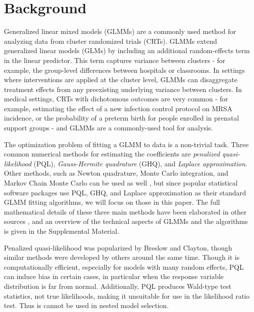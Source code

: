 \documentclass[Afour,times,sagev,doublespace]{sagej}
\begin{document}
\section{Background}
Generalized linear mixed models (GLMMs) are a commonly used method for analyzing data from cluster randomized trials (CRTs). GLMMs extend generalized linear models (GLMs) by including an additional random-effects term in the linear predictor. This term captures variance between clusters - for example, the group-level differences between hospitals or classrooms. In settings where interventions are applied at the cluster level, GLMMs can disaggregate treatment effects from any preexisting underlying variance between clusters. In medical settings, CRTs with dichotomous outcomes are very common - for example, estimating the effect of a new infection control protocol on MRSA incidence, or the probability of a preterm birth for people enrolled in prenatal support groups - and GLMMs are a commonly-used tool for analysis. 

The optimization problem of fitting a GLMM to data is a non-trivial task. Three common numerical methods for estimating the coefficients are \textit{penalized quasi-likelihood} (PQL), \textit{Gauss-Hermite quadrature} (GHQ), and \textit{Laplace approximation}. Other methods, such as Newton quadrature, Monte Carlo integration, and Markov Chain Monte Carlo can be used as well \cite{zhang_fitting_2011}, but since popular statistical software packages use PQL, GHQ, and Laplace approximation as their standard GLMM fitting algorithms, we will focus on those in this paper. The full mathematical details of these three main methods have been elaborated in other sources \cite{wolfinger_generalized_1993}\cite{pinheiro_efficient_2006}, and an overview of the technical aspects of GLMMs and the algorithms is given in the Supplemental Material.

Penalized quasi-likelihood was popularized by Breslow and Clayton\cite{breslow_approximate_1993}, though similar methods were developed by others\cite{zeger_models_1988}\cite{engel_simple_1994} around the same time. Though it is computationally efficient, especially for models with many random effects, PQL can induce bias in certain cases, in particular when the response variable distribution is far from normal\cite{agresti_categorical_2013}\cite{rodriguez_assessment_1995}\cite{breslow_bias_1995}\cite{lin_bias_1996}. Additionally, PQL produces Wald-type test statistics, not true likelihoods, making it unsuitable for use in the likelihood ratio test.  Thus is cannot be used in nested model selection\cite{zhang_fitting_2011}\cite{pinheiro_efficient_2006}\cite{ng_estimation_2006}.
\end{document}
